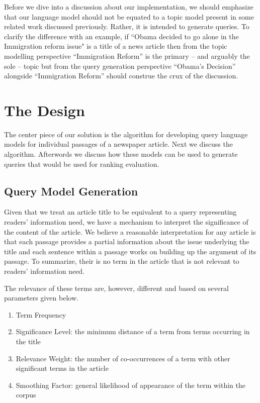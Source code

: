 \documentclass[article]{IEEEtran}
\begin{document}
Before we dive into a discussion about our implementation, we should emphasize that our language model should not be equated to a topic model present in some related work discussed previously. Rather, it is intended to generate queries. To clarify the difference with an example, if ``Obama decided to go alone in the Immigration reform issue" is a title of a news article then from the topic modelling perspective ``Immigration Reform'' is the primary -- and arguably the sole -- topic but from the query generation perspective ``Obama's Decision'' alongside ``Immigration Reform'' should construe the crux of the discussion.    

\section{The Design}
\label{des}
The center piece of our solution is the algorithm for developing query language models for individual passages of a newspaper article. Next we discuss the algorithm. Afterwords we discuss how these models can be used to generate queries that would be used for ranking evaluation.   

\subsection{Query Model Generation}
Given that we treat an article title to be equivalent to a query representing readers' information need, we have a mechanism to interpret the significance of the content of the article. We believe a reasonable interpretation for any article is that each passage provides a partial information about the issue underlying the title and each sentence within a passage works on building up the argument of its passage. To summarize, their is no term in the article that is not relevant to readers' information need.     

The relevance of these terms are, however, different and based on several parameters given below. 

\begin{enumerate}
\item Term Frequency
\item Significance Level: the minimum distance of a term from terms occurring in the title
\item Relevance Weight: the number of co-occurrences of a term with other significant terms in the article 
\item Smoothing Factor: general likelihood of appearance of the term within the corpus      
\end{enumerate}
\end{document}
